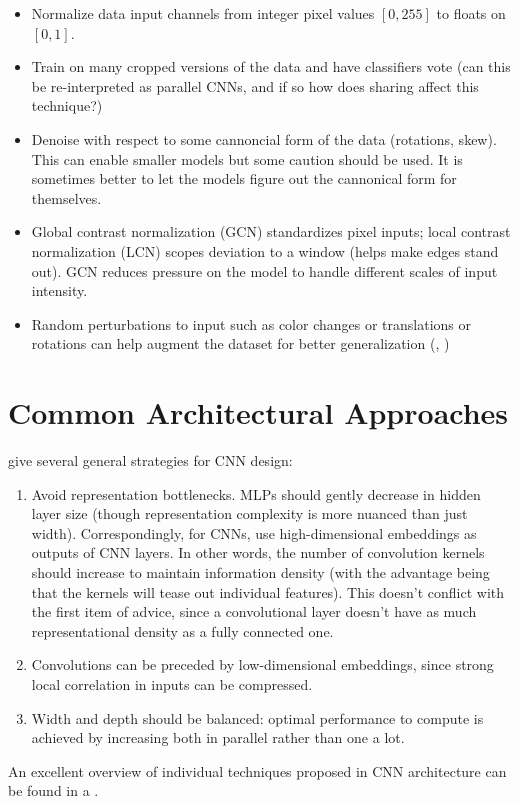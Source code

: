 \documentclass{article}
\begin{document}
\begin{itemize}
\item Normalize data input channels from integer pixel values $[0,255]$ to floats on $[0,1]$.
\item Train on many cropped versions of the data and have classifiers vote (can this be re-interpreted as parallel CNNs, and if so how does sharing affect this technique?)
\item Denoise with respect to some cannoncial form of the data (rotations, skew). This can enable smaller models but some caution should be used. It is sometimes better to let the models figure out the cannonical form for themselves.
\item Global contrast normalization (GCN) standardizes pixel inputs; local contrast normalization (LCN) scopes deviation to a window (helps make edges stand out). GCN reduces pressure on the model to handle different scales of input intensity.
\item Random perturbations to input such as color changes or translations or rotations can help augment the dataset for better generalization (, )
\end{itemize}

\section{Common Architectural Approaches}

 give several general strategies for CNN design:
\begin{enumerate}
\item Avoid representation bottlenecks. MLPs should gently decrease in hidden layer size (though representation complexity is more nuanced than just width). Correspondingly, for CNNs, use high-dimensional embeddings as outputs of CNN layers. In other words, the number of convolution kernels should increase to maintain information density (with the advantage being that the kernels will tease out individual features). This doesn't conflict with the first item of advice, since a convolutional layer doesn't have as much representational density as a fully connected one.
\item Convolutions can be preceded by low-dimensional embeddings, since strong local correlation in inputs can be compressed.
\item Width and depth should be balanced: optimal performance to compute is achieved by increasing both in parallel rather than one a lot.
\end{enumerate}

An excellent overview of individual techniques proposed in CNN architecture can be found in a .
\end{document}

